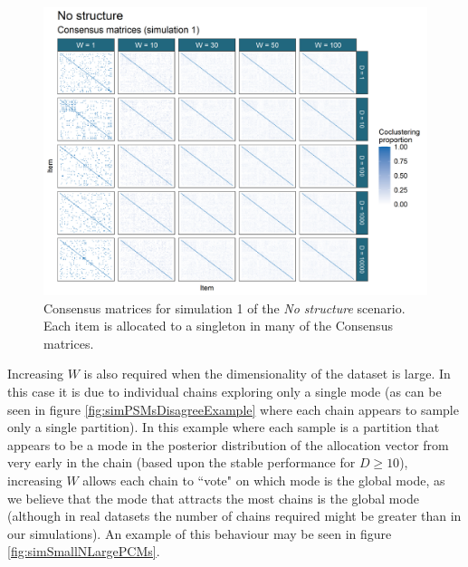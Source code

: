 \documentclass[]{article}
\begin{document}
\begin{figure} %
	\centering
	\includegraphics[scale=0.65]{./Images/Simulations/CMs/no_structureSim1.png}
	\caption{Consensus matrices for simulation 1 of the \emph{No structure} scenario. Each item is allocated to a singleton in many of the Consensus matrices.}
	\label{fig:simNoStructCMs}
\end{figure}

Increasing $W$ is also required when the dimensionality of the dataset is large. In this case it is due to individual chains exploring only a single mode (as can be seen in figure \ref{fig:simPSMsDisagreeExample} where each chain appears to sample only a single partition). In this example where each sample is a partition that appears to be a mode in the posterior distribution of the allocation vector from very early in the chain (based upon the stable performance for $D \geq 10$), increasing $W$ allows each chain to ``vote" on which mode is the global mode, as we believe that the mode that attracts the most chains is the global mode (although in real datasets the number of chains required might be greater than in our simulations). An example of this behaviour may be seen in figure \ref{fig:simSmallNLargePCMs}.
\end{document}
